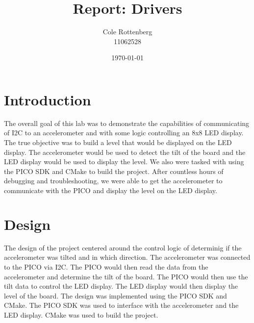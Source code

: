 \documentclass{article}
\title{Report: Drivers}
\author{Cole Rottenberg \\ 11062528}
\date{\today}
\begin{document}
\maketitle

\section*{Introduction}

The overall goal of this lab was to demonstrate the capabilities of communicating of I2C to an accelerometer and with some logic controlling an 8x8 LED display. The true objective was to build a level that would be displayed on the LED display. The accelerometer would be used to detect the tilt of the board and the LED display would be used to display the level. We also were tasked with using the PICO SDK and CMake to build the project. After countless hours of debugging and troubleshooting, we were able to get the accelerometer to communicate with the PICO and display the level on the LED display.

\section*{Design}

The design of the project centered around the control logic of determinig if the accelerometer was tilted and in which direction. The accelerometer was connected to the PICO via I2C. The PICO would then read the data from the accelerometer and determine the tilt of the board. The PICO would then use the tilt data to control the LED display. The LED display would then display the level of the board. The design was implemented using the PICO SDK and CMake. The PICO SDK was used to interface with the accelerometer and the LED display. CMake was used to build the project.
\end{document}
